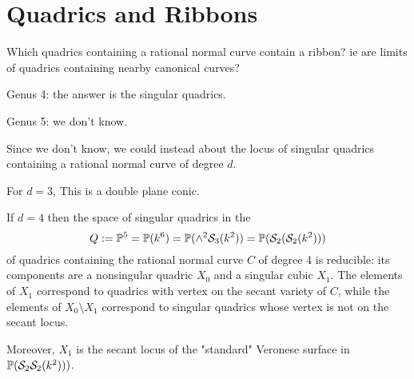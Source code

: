 

\chapter{Quadrics and Ribbons}
\label{Quadrics and Ribbons}

\begin{question}
 Which quadrics containing a rational normal curve contain a ribbon? ie are limits of quadrics containing nearby canonical curves?
\end{question}

Genus 4: the answer is the singular quadrics.


Genus 5: we don't know.

Since we don't know, we could instead about the locus of singular quadrics containing a rational normal curve of degree $d$.

For $d=3$, This is a double plane conic.

\def\cS{{\mathcal S}}
\begin{theorem}
 If $d=4$ then the space of singular quadrics in the 
 $$
 Q :=\PP^5 = \PP(k^6) = \PP(\wedge^2 \cS_3(k^2)) = \PP(\cS_2(\cS_2(k^2)))
 $$
 of quadrics containing the rational normal curve $C$ of degree 4 is reducible: its components are a nonsingular quadric $X_0$ and a singular cubic $X_1$. The elements of $X_1$ correspond to quadrics with vertex on the secant variety of $C$, while the elements of $X_0\setminus X_1$ correspond to singular quadrics whose vertex is not on the secant locus.
 
 Moreover, $X_1$ is the secant locus of the "standard" Veronese surface in $\PP(\cS_2\cS_2(k^2)))$.
\end{theorem}

